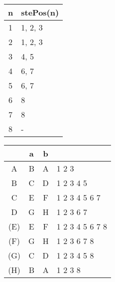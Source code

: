 \documentclass[11pt,a4paper]{report}
\begin{document}
\begin{tabular} {| c | l |}
\hline
n & stePos(n) \\ \hline
1 & 1, 2, 3 \\ \hline
2 & 1, 2, 3 \\ \hline
3 & 4, 5 \\ \hline
4 & 6, 7 \\ \hline
5 & 6, 7 \\ \hline
6 & 8 \\ \hline
7 & 8 \\ \hline
8 & - \\ \hline
\end{tabular}
\quad
\begin{tabular} {| c | c |c | l |}
\hline 
& a & b & \\ \hline
A & B & A & 1 2 3 \\ \hline
B & C & D & 1 2 3 4 5 \\ \hline
C & E & F & 1 2 3 4 5 6 7 \\ \hline
D & G & H & 1 2 3 6 7 \\ \hline
(E) & E & F & 1 2 3 4 5 6 7 8 \\ \hline
(F) & G & H & 1 2 3 6 7 8 \\ \hline
(G) & C & D & 1 2 3 4 5 8 \\ \hline
(H) & B & A & 1 2 3 8 \\ \hline
\end{tabular}
\end{document}
